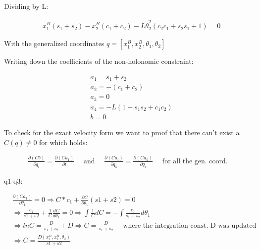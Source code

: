 Dividing by L:

\begin{equation}
    \begin{split}           
        &\dot x_1^B\left(s_1+s_2\right)-\dot x_2^B\left(c_1+c_2\right)-
        L\dot\theta_2^2\left(c_2c_1+s_2s_1 + 1\right) = 0
    \end{split}
\end{equation}

With the generalized coordinates $q = [x_1^B,x_2^B,\theta_1,\theta_2]$

Writing down the coefficients of the non-holonomic constraint:

\begin{equation}
    \begin{split}
        &a_1 = s_1 + s_2\\
        &a_2 = -\left(c_1 + c_2\right)\\
        &a_3 = 0\\
        &a_4 = -L\left(1 + s_1s_2 + c_1c_2\right)\\
        &b = 0
    \end{split}
\end{equation}

\clearpage
To check for the exact velocity form we want to proof that there can't exist a $C(q) \neq 0$ for which holds:

\begin{equation}
    \begin{split}
        \frac{\partial(Cb)}{\partial q_i} = \frac{\partial(Ca_1)}{\partial t}\quad \text{ and } \quad \frac{\partial(Ca_i)}{\partial q_k} = \frac{\partial(Ca_k)}{\partial q_i} \quad \text{ for all the gen. coord. }
    \end{split}
\end{equation}

q1-q3:

\begin{equation}
    \begin{split}
        &\frac{\partial(Ca_1)}{\partial \theta_1} = 0 \Rightarrow C*c_1 + \frac{\partial C}{\partial \theta_1}(s1 + s2) = 0\\
        &\Rightarrow \frac{c_1}{s1+s2} + \frac{1}{C}\frac{d C}{d \theta_1} = 0 \Rightarrow \int \frac{1}{C}dC = - \int \frac{c_1}{s_1+s_2}d\theta_1\\
        &\Rightarrow lnC = \frac{D}{s_1+s_2} + D \Rightarrow C = \frac{D}{s_1+s_2} \quad \text{ where the integration const. D was updated}\\
        &\Rightarrow C = \frac{D(x_1^B,x_2^B,\theta_2)}{s1 + s2}
    \end{split}
\end{equation}

